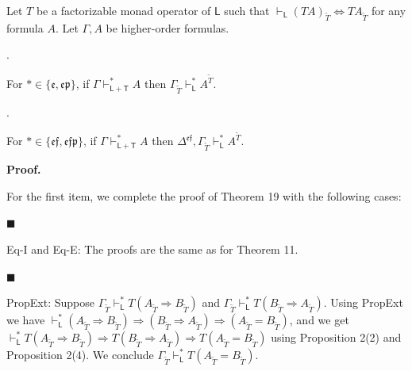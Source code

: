 \documentclass[10pt,a4paper]{article}
\begin{document}
 
Let $T$ be a factorizable monad operator of $\mathsf{L}$ such that $\vdash_{\mathsf{L}}(TA)_{\widetilde{T}}\Leftrightarrow TA_{\widetilde{T}}$ for any formula $A$. Let $\Gamma,A$ be higher-order formulas.\par
  
\par{}. 
 
For $*\in\{\mathfrak{e},\mathfrak{e}\mathfrak{p}\}$, if $\Gamma\vdash_{\mathsf{L}+\mathsf{T}}^{*}A$ then $\Gamma_{\widetilde{T}}\vdash_{\mathsf{L}}^{*}A^{\widetilde{T}}$.\par
 
 
 
\par{}. 
 
For $*\in\{\mathfrak{e}\mathfrak{f},\mathfrak{e}\mathfrak{f}\mathfrak{p}\}$, if $\Gamma\vdash_{\mathsf{L}+\mathsf{T}}^{*}A$ then $\Delta^{\mathfrak{e}\mathfrak{f}},\Gamma_{\widetilde{T}}\vdash_{\mathsf{L}}^{*}A^{\widetilde{T}}$.\par
 
 
  
 
 
 
 
\par\medskip\noindent\textbf{Proof.}\par
 
 
For the first item, we complete the proof of Theorem 19 with the following cases:\par
  
\par\noindent  $\blacksquare$ 
 
Eq-I and Eq-E: The proofs are the same as for Theorem 11.\par
 
 
 
\par\noindent  $\blacksquare$ 
 
PropExt: Suppose $\Gamma_{\widetilde{T}}\vdash_{\mathsf{L}}^{*}T(A_{\widetilde{T}}\mathbin{\Rightarrow}B_{\widetilde{T}})$ and $\Gamma_{\widetilde{T}}\vdash_{\mathsf{L}}^{*}T(B_{\widetilde{T}}\mathbin{\Rightarrow}A_{\widetilde{T}})$. Using PropExt we have $\vdash_{\mathsf{L}}^{*}(A_{\widetilde{T}}\mathbin{\Rightarrow}B_{\widetilde{T}})\mathbin{\Rightarrow}(B_{\widetilde{T}}\mathbin{\Rightarrow}A_{\widetilde{T}})\mathbin{\Rightarrow}(A_{\widetilde{T}}=B_{\widetilde{T}})$, and we get $\vdash_{\mathsf{L}}^{*}T(A_{\widetilde{T}}\mathbin{\Rightarrow}B_{\widetilde{T}})\mathbin{\Rightarrow}T(B_{\widetilde{T}}\mathbin{\Rightarrow}A_{\widetilde{T}})\mathbin{\Rightarrow}T(A_{\widetilde{T}}=B_{\widetilde{T}})$ using Proposition 2(2) and Proposition 2(4). We conclude $\Gamma_{\widetilde{T}}\vdash_{\mathsf{L}}^{*}T(A_{\widetilde{T}}=B_{\widetilde{T}})$.\par
 
\end{document}
